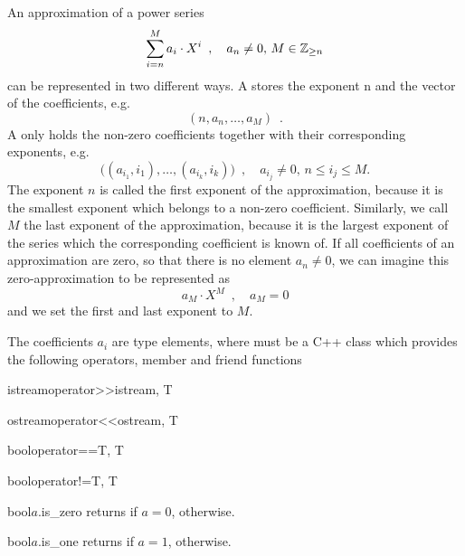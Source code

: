An approximation of a power series
\begin{displaymath}
  \sum_{i=n}^{M} a_{i} \cdot X^{i} \enspace,\quad a_{n} \neq 0,\, M \in \mathbb{Z}_{\geq n}
\end{displaymath}
can be represented in two different ways.  A  stores the exponent n
and the vector of the coefficients, e.g.
\begin{displaymath}
  (n, a_{n}, \dots, a_{M}) \enspace.
\end{displaymath}
A  only holds the non-zero coefficients together with their
corresponding exponents, e.g.
\begin{displaymath}
  \biggl( (a_{i_{1}},i_{1}), \dots, (a_{i_{k}},i_{k}) \biggr)\enspace, \quad a_{i_{j}} \neq 0,\,
  n \leq i_{j} \leq M.
\end{displaymath}
The exponent $n$ is called the first exponent of the approximation, because it is the smallest
exponent which belongs to a non-zero coefficient.  Similarly, we call $M$ the last exponent of
the approximation, because it is the largest exponent of the series which the corresponding
coefficient is known of.  If all coefficients of an approximation are zero, so that there is no
element $a_{n} \neq 0$, we can imagine this zero-approximation to be represented as
\begin{displaymath}
  a_{M} \cdot X^{M}\enspace, \quad a_{M} = 0
\end{displaymath}
and we set the first and last exponent to $M$.

The coefficients $a_{i}$ are type  elements, where  must be a C++ class which
provides the following operators, member and friend functions


\begin{fcode}{istream}{operator>>}{istream, T}
\end{fcode}
\begin{fcode}{ostream}{operator<<}{ostream, T}
\end{fcode}
\begin{fcode}{bool}{operator==}{T, T}
\end{fcode}
\begin{fcode}{bool}{operator!=}{T, T}
\end{fcode}

\begin{cfcode}{bool}{$a$.is_zero}{}
  returns \TRUE if $a = 0$, \FALSE otherwise.
\end{cfcode}

\begin{cfcode}{bool}{$a$.is_one}{}
  returns \TRUE if $a = 1$, \FALSE otherwise.
\end{cfcode}

